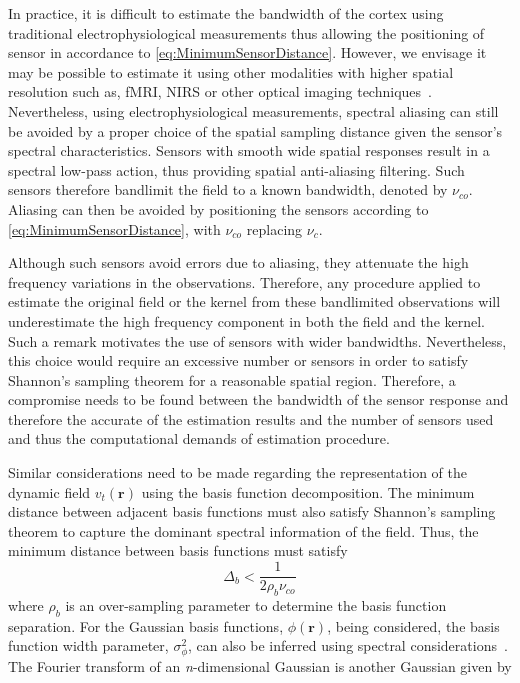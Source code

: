 \documentclass[12pt]{iopart}
\begin{document}
In practice, it is difficult to estimate the bandwidth of the cortex using traditional electrophysiological measurements thus allowing the positioning of sensor in accordance to \ref{eq:MinimumSensorDistance}. However, we envisage it may be possible to estimate it using other modalities with higher spatial resolution such as, fMRI, NIRS or other optical imaging techniques~\cite{Issa2000}. Nevertheless, using electrophysiological measurements, spectral aliasing can still be avoided by a proper choice of the spatial sampling distance given the sensor's spectral characteristics. Sensors with smooth wide spatial responses result in a spectral low-pass action, thus providing spatial anti-aliasing filtering. Such sensors therefore bandlimit the field to a known bandwidth, denoted by $\nu_{co}$. Aliasing can then be avoided by positioning the sensors according to \ref{eq:MinimumSensorDistance}, with $\nu_{co}$ replacing $\nu_c$. 

Although such sensors avoid errors due to aliasing, they attenuate the high frequency variations in the observations. Therefore, any procedure applied to estimate the original field or the kernel from these bandlimited observations will underestimate the high frequency component in both the field and the kernel. Such a remark motivates the use of sensors with wider bandwidths. Nevertheless, this choice would require an excessive number or sensors in order to satisfy Shannon's sampling theorem for a reasonable spatial region. Therefore, a compromise needs to be found between the bandwidth of the sensor response and therefore the accurate of the estimation results and the number of sensors used and thus the computational demands of estimation procedure.

Similar considerations need to be made regarding the representation of the dynamic field $v_t(\mathbf{r})$ using the basis function decomposition. The minimum distance between adjacent basis functions must also satisfy Shannon's sampling theorem to capture the dominant spectral information of the field. Thus, the minimum distance between basis functions must satisfy 
\begin{equation}\label{eq:BasisFunctionSeparation}
	\Delta_b < \frac{1}{2\rho_b\nu_{co}}
\end{equation}
where $\rho_b$ is an over-sampling parameter to determine the basis function separation. For the Gaussian basis functions, $\phi(\mathbf{r})$, being considered, the basis function width parameter, $\sigma_{\phi}^2$, can also be inferred using spectral considerations~\cite{Sanner1992,Scerri2009}. The Fourier transform of an \textit{n}-dimensional Gaussian is another Gaussian given by
\end{document}
